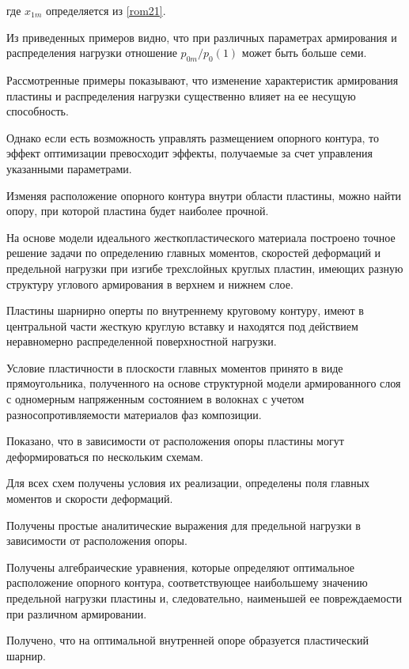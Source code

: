 где $x_{1m}$ определяется из \eqref{rom21}.

Из приведенных примеров видно, что при различных параметрах армирования и распределения нагрузки отношение $p_{0m}/p_0(1)$ может быть больше семи.



Рассмотренные примеры показывают, что изменение характеристик армирования пластины и распределения нагрузки существенно влияет на ее несущую способность.

Однако если есть возможность управлять размещением опорного контура, то эффект оптимизации превосходит эффекты, получаемые за счет управления указанными параметрами.

Изменяя расположение опорного контура внутри области пластины, можно найти опору, при которой пластина будет наиболее прочной.



\smallskip



 На основе модели идеального жесткопластического материала построено точное решение задачи по определению главных моментов, скоростей деформаций и предельной нагрузки при изгибе трехслойных круглых пластин, имеющих разную структуру углового армирования в верхнем и нижнем слое.

Пластины шарнирно оперты по внутреннему круговому контуру, имеют в центральной части жесткую круглую вставку и находятся под действием неравномерно распределенной поверхностной нагрузки.

Условие пластичности в плоскости главных моментов принято в виде прямоугольника, полученного на основе структурной модели армированного слоя с одномерным напряженным состоянием в волокнах с учетом разносопротивляемости материалов фаз композиции.

Показано, что в зависимости от расположения опоры пластины могут деформироваться по нескольким схемам.

Для всех схем получены условия их реализации, определены поля главных моментов и скорости деформаций.

Получены простые аналитические выражения для предельной нагрузки в зависимости от расположения опоры.

Получены алгебраические уравнения, которые определяют оптимальное расположение опорного контура, соответствующее наибольшему значению предельной нагрузки пластины и, следовательно, наименьшей ее повреждаемости при различном армировании.

Получено, что на оптимальной внутренней опоре образуется пластический шарнир.

